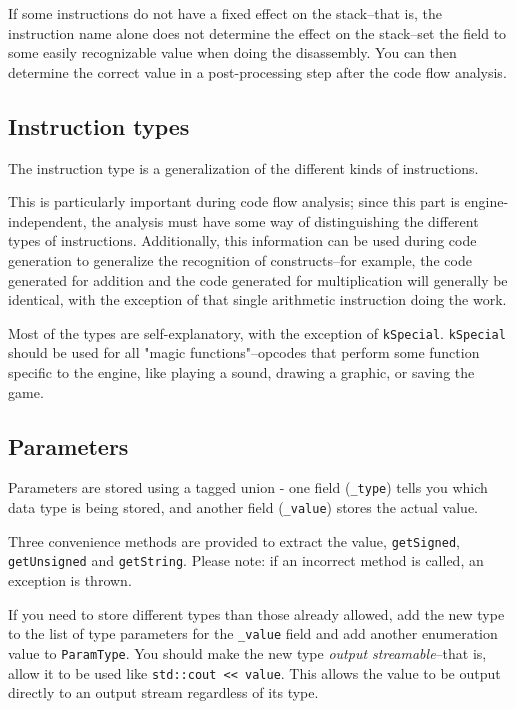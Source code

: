 If some instructions do not have a fixed effect on the stack--that is, the instruction name alone does not determine the effect on the stack--set the field to some easily recognizable value when doing the disassembly. You can then determine the correct value in a post-processing step after the code flow analysis.

\subsection{Instruction types}
\label{sec:insttype}
The instruction type is a generalization of the different kinds of instructions.

This is particularly important during code flow analysis; since this part is engine-independent, the analysis must have some way of distinguishing the different types of instructions. Additionally, this information can be used during code generation to generalize the recognition of constructs--for example, the code generated for addition and the code generated for multiplication will generally be identical, with the exception of that single arithmetic instruction doing the work.

Most of the types are self-explanatory, with the exception of \verb+kSpecial+. \verb+kSpecial+ should be used for all "magic functions"--opcodes that perform some function specific to the engine, like playing a sound, drawing a graphic, or saving the game.

\subsection{Parameters}
\label{sec:parameter}
Parameters are stored using a tagged union - one field (\verb+_type+) tells you which data type is being stored, and another field (\verb+_value+) stores the actual value.

Three convenience methods are provided to extract the value, \verb+getSigned+, \verb+getUnsigned+ and \verb+getString+. Please note: if an incorrect method is called, an exception is thrown.

If you need to store different types than those already allowed, add the new type to the list of type parameters for the \verb+_value+ field and add another enumeration value to \verb+ParamType+. You should make the new type \emph{output streamable}--that is, allow it to be used like \verb+std::cout << value+. This allows the value to be output directly to an output stream regardless of its type.

